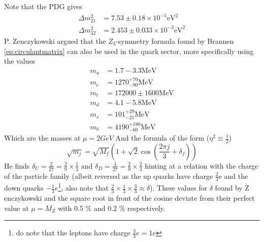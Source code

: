 \documentclass[twoside,twocolumn,11pt]{article} %
\begin{document}
Note that the PDG\cite{PDG} gives
\begin{align}
	\Delta m_{21}^2 &= 7.53\pm 0.18\times10^{-5} \text{eV}^2\\
	\Delta m_{32}^2 &= 2.453\pm 0.033 \times 10^{-3}\text{eV}^2
\end{align} 
P. $\dot{\text{Z}}$enczykowski argued \cite{Zenczykowski} that the $Z_3$-symmetry formula found by Brannen \ref{eq:circulantmatrix} can also be used in the quark sector, more specifically using the values
\begin{align}
	m_{u} &=1.7-3.3 \text{MeV}\\
	m_{c} &=1270_{-90}^{+70} \text{MeV}\\
	m_{t} &=172000 \pm 1600 \text{MeV}\\
	m_{d} &=4.1-5.8 \text{MeV}\\
	m_{s} &=101_{-21}^{+29} \text{MeV}\\
	m_{b} &=4190_{-60}^{+180}\text{MeV}
\end{align}
Which are the masses at $\mu =  2 GeV$
And the formula of the form ($\eta^2\equiv \frac{1}{2}$)
\begin{equation}
	\sqrt{m_{j}}=\sqrt{M_{f}}\left(1+\sqrt{2}\cos \left(\frac{2 \pi j}{3}+\delta_{f}\right)\right)
\end{equation}
He finds $\delta_U=\frac{2}{27}=\frac{2}{9} \times \frac{1}{3} \text { and } \delta_D=\frac{4}{27}=\frac{2}{9} \times \frac{2}{3}$  hinting at a relation with the charge of the particle family (albeit reversed as the up quarks have charge $\frac{2}{3}$e and the down quarks $-\frac{1}{3}e$\footnote{do note that the leptons have charge $\frac{3}{3}e=1e$}, also note that $\frac{2}{3}\times\frac{1}{3}\times\frac{3}{3} \approx \delta$). These values for $\delta$ found by  $\dot{\text{Z}}$enczykowski and the square root in front of the cosine deviate from their perfect value at $\mu = M_Z$ with 0.5 \% and 0.2 \% respectively.
\end{document}
